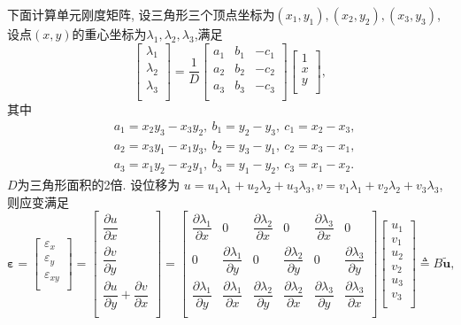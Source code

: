 \documentclass[a4paper, 11pt]{ctexart}
\newcommand\pd[2]{\dfrac{\partial {#1}}{\partial {#2}}}
\newcommand\beps{\bm{\varepsilon}}
\begin{document}
下面计算单元刚度矩阵,
设三角形三个顶点坐标为$(x_1,y_1),(x_2,y_2),(x_3,y_3)$,
设点$(x,y)$的重心坐标为$\lambda_1,\lambda_2,\lambda_3$,满足
\begin{equation}
  \begin{bmatrix}
    \lambda_1\\ \lambda_2\\ \lambda_3\\
  \end{bmatrix}
  =
  \dfrac{1}{D}
  \begin{bmatrix}
    a_1 & b_1 & -c_1 \\
    a_2 & b_2 & -c_2 \\
    a_3 & b_3 & -c_3 \\
  \end{bmatrix}
  \begin{bmatrix}
    1 \\ x \\ y\\
  \end{bmatrix},
\end{equation}
其中
\begin{align}
& a_1=x_2y_3-x_3y_2,~b_1=y_2-y_3,~c_1=x_2-x_3, \\
& a_2=x_3y_1-x_1y_3,~b_2=y_3-y_1,~c_2=x_3-x_1, \\
& a_3=x_1y_2-x_2y_1,~b_3=y_1-y_2,~c_3=x_1-x_2.
\end{align}
$D$为三角形面积的2倍.
设位移为
$u=u_1\lambda_1+u_2\lambda_2+u_3\lambda_3,v=v_1\lambda_1+v_2\lambda_2+v_3\lambda_3$,
则应变满足
\begin{equation}
  \beps=
  \begin{bmatrix}
    \varepsilon_x \\
    \varepsilon_y \\
    \varepsilon_{xy}\\
  \end{bmatrix}
  =
  \begin{bmatrix}
    \pd{u}{x} \\
    \pd{v}{y} \\
    \pd{u}{y}+\pd{v}{x} \\
  \end{bmatrix}
    =
    \begin{bmatrix}
      \pd{\lambda_1}{x} & 0 & \pd{\lambda_2}{x} & 0 & \pd{\lambda_3}{x} & 0 \\
      0 & \pd{\lambda_1}{y} & 0 & \pd{\lambda_2}{y} & 0 & \pd{\lambda_3}{y} \\
      \pd{\lambda_1}{y} & \pd{\lambda_1}{x} & \pd{\lambda_2}{y} & \pd{\lambda_2}{x} & \pd{\lambda_3}{y} & \pd{\lambda_3}{x} \\
    \end{bmatrix}
    \begin{bmatrix}
      u_1 \\ v_1 \\ u_2 \\ v_2 \\ u_3 \\ v_3 \\
    \end{bmatrix}
    \triangleq B\tilde{\bm{u}},
\end{equation}
\end{document}
